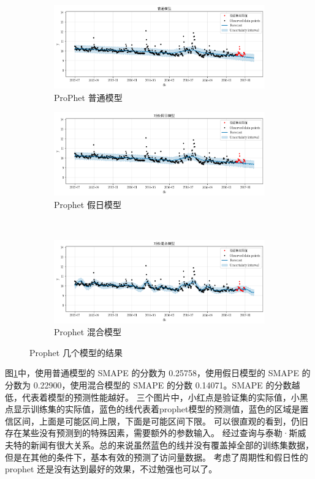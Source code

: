 \begin{figure}[htbp]
\centering
\begin{subfigure}{.5\textwidth}
  \centering
  \includegraphics[width=\linewidth]{figures/prophet_normal.png}
  \caption{ProPhet 普通模型}
\end{subfigure}%
\begin{subfigure}{.5\textwidth}
  \centering
  \includegraphics[width=\linewidth]{figures/prophet_holidays.png}
  \caption{Prophet 假日模型}
\end{subfigure}\\
\begin{subfigure}{\textwidth}
  \centering
  \includegraphics[width=\linewidth]{figures/prophet_mix.png}
  \caption{Prophet 混合模型}
\end{subfigure}
\caption{Prophet 几个模型的结果}
\label{compare_model}
\end{figure}

图\ref{compare_model}中，使用普通模型的 SMAPE 的分数为 0.25758，使用假日模型的 SMAPE 的分数为 0.22900，使用混合模型的 SMAPE 的分数 0.14071。SMAPE 的分数越低，代表着模型的预测性能越好。
三个图片中，小红点是验证集的实际值，小黑点显示训练集的实际值，蓝色的线代表着prophet模型的预测值，蓝色的区域是置信区间，上面是可能区间上限，下面是可能区间下限。
可以很直观的看到，仍旧存在某些没有预测到的特殊因素，需要额外的参数输入。
经过查询与泰勒·斯威夫特的新闻有很大关系。总的来说虽然蓝色的线并没有覆盖掉全部的训练集数据，但是在其他的条件下，基本有效的预测了访问量数据。
考虑了周期性和假日性的 prophet 还是没有达到最好的效果，不过勉强也可以了。


